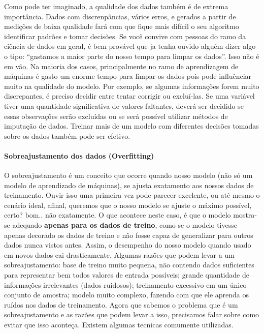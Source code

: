 \documentclass[
  letterpaper,
  DIV=11,
  numbers=noendperiod]{scrreprt}
\let\oldparagraph\paragraph
\renewcommand{\paragraph}[1]{\oldparagraph{#1}\mbox{}}
\begin{document}
Como pode ter imaginado, a qualidade dos dados também é de extrema
importância. Dados com discrenpâncias, vários erros, e gerados a partir
de medições de baixa qualidade fará com que fique mais difícil o seu
algoritmo identificar padrões e tomar decisões. Se você convive com
pessoas do ramo da ciência de dados em geral, é bem provável que ja
tenha ouvido alguém dizer algo o tipo: ``gastamos a maior parte do nosso
tempo para limpar os dados''. Isso não é em vão. Na maioria dos casos,
principalmente no ramo de aprendizagem de máquinas é gasto um enorme
tempo para limpar os dados pois pode influênciar muito na qualidade do
modelo. Por exemplo, se algumas informações forem muito discrepantes, é
preciso decidir entre tentar corrigir ou excluí-las. Se uma variável
tiver uma quantidade significativa de valores faltantes, deverá ser
decidido se essas observações serão excluídas ou se será possível
utilizar métodos de imputação de dados. Treinar mais de um modelo com
diferentes decisões tomadas sobre os dados também pode ser efetivo.

\hypertarget{sobreajustamento-dos-dados-overfitting}{%
\paragraph{\texorpdfstring{Sobreajustamento dos dados
(\textbf{Overfitting})}{Sobreajustamento dos dados (Overfitting)}}\label{sobreajustamento-dos-dados-overfitting}}

O sobreajustamento é um conceito que ocorre quando nosso modelo (não só
um modelo de aprendizado de máquinas), se ajusta exatamento aos nossos
dados de treinamento. Ouvir isso uma primeira vez pode parecer
excelente, ou até mesmo o cenário ideal, afinal, queremos que o nosso
modelo se ajuste o máximo possível, certo? bom.. não exatamente. O que
acontece neste caso, é que o modelo mostra-se adequado \textbf{apenas
para os dados de treino}, como se o modelo tivesse apenas decorado os
dados de treino e não fosse capaz de generalizar para outros dados nunca
vistos antes. Assim, o desempenho do nosso modelo quando usado em novos
dados cai drasticamente. Algumas razões que podem levar a um
sobreajustamento: base de treino muito pequena, não contendo dados
suficientes para representar bem todos valores de entrada possíveis;
grande quantidade de informações irrelevantes (dados ruidosos);
treinamento excessivo em um único conjunto de amostra; modelo muito
complexo, fazendo com que ele aprenda os ruídos nos dados de
treinamento. Agora que sabemos o problema que é um sobreajustamento e as
razões que podem levar a isso, precisamos falar sobre como evitar que
isso aconteça. Existem algumas tecnicas comumente utilizadas.
\end{document}
